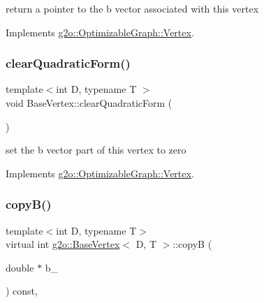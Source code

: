 return a pointer to the b vector associated with this vertex 



Implements \mbox{\hyperlink{classg2o_1_1_optimizable_graph_1_1_vertex_a84465a61c6d322f7d64833129cc7d55a}{g2o\+::\+Optimizable\+Graph\+::\+Vertex}}.

\mbox{\label{classg2o_1_1_base_vertex_a144f99c7aa36a100dea65b30793e6d76}} 
\subsubsection{\texorpdfstring{clear\+Quadratic\+Form()}{clearQuadraticForm()}}
{\footnotesize\ttfamily template$<$int D, typename T $>$ \\
void Base\+Vertex\+::clear\+Quadratic\+Form (\begin{DoxyParamCaption}{ }\end{DoxyParamCaption})\hspace{0.3cm}{\ttfamily [virtual]}}

set the b vector part of this vertex to zero 

Implements \mbox{\hyperlink{classg2o_1_1_optimizable_graph_1_1_vertex_a803897f6bae25dece4d7e23330f0f9da}{g2o\+::\+Optimizable\+Graph\+::\+Vertex}}.

\mbox{\label{classg2o_1_1_base_vertex_a3629d3b15da425476e15867fb03b781b}} 
\subsubsection{\texorpdfstring{copy\+B()}{copyB()}}
{\footnotesize\ttfamily template$<$int D, typename T$>$ \\
virtual int \mbox{\hyperlink{classg2o_1_1_base_vertex}{g2o\+::\+Base\+Vertex}}$<$ D, T $>$\+::copyB (\begin{DoxyParamCaption}\item[{double $\ast$}]{b\+\_\+ }\end{DoxyParamCaption}) const\hspace{0.3cm}{\ttfamily [inline]}, {\ttfamily [virtual]}}


